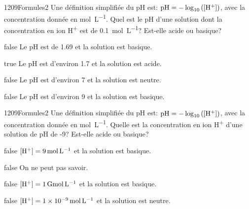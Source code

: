 \documentclass[11pt]{article}
\begin{document}
		\begin{question}{1209}{Formules}{2}{}
            Une définition simplifiée du pH est: $\text{pH} = -\log_{10}\left(\text{[H\textsuperscript{+}]}\right)$, avec la concentration donnée en \si{\mol\per\liter}. Quel est le pH d'une solution dont la concentration en ion H\textsuperscript{+} est de \SI{0.1}{\mol\per\liter}? Est-elle acide ou basique?
        \end{question}
        \begin{reponses}
    	    \item[false] Le pH est de \num{1.69} et la solution est basique.
    	    \item[true] Le pH est d'environ \num{1.7} et la solution est acide.
    	    \item[false] Le pH est d'environ \num{7} et la solution est neutre.
    	    \item[false] Le pH est d'environ \num{9} et la solution est basique.
        \end{reponses}
		
		\begin{question}{1209}{Formules}{2}{}
            Une définition simplifiée du pH est: $\text{pH} = -\log_{10}\left(\text{[H\textsuperscript{+}]}\right)$, avec la concentration donnée en \si{\mol\per\liter}. Quelle est la concentration en ion H\textsuperscript{+} d'une solution de pH de -9? Est-elle acide ou basique?
        \end{question}
        \begin{reponses}
    	    \item[false] $\text{[H\textsuperscript{+}]} = \SI{9}{\mol\per\liter}$ et la solution est basique.
    	    \item[false] On ne peut pas savoir.
    	    \item[false] $\text{[H\textsuperscript{+}]} = \SI{1}{\giga\mol\per\liter}$ et la solution est basique.
    	    \item[false] $\text{[H\textsuperscript{+}]} = \SI{1e-9}{\mol\per\liter}$ et la solution est neutre.
        \end{reponses}
		
\end{document}
